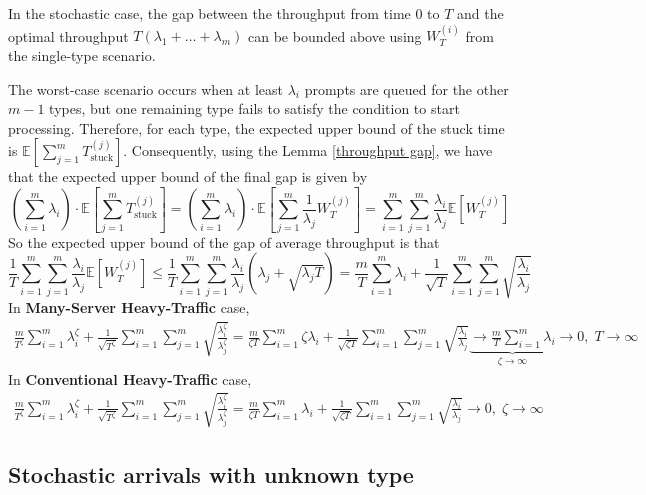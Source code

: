 \documentclass[opre, nonblindrev]{informs3} %
\begin{document}
In the stochastic case, the gap between the throughput from time $0$ to $T$ and the optimal throughput $T(\lambda_1 + \dots + \lambda_m)$ can be bounded above using $W_T^{(i)}$ from the single-type scenario.

The worst-case scenario occurs when at least $\lambda_i$ prompts are queued for the other $m-1$ types, but one remaining type fails to satisfy the condition to start processing. Therefore, for each type, the expected upper bound of the stuck time is $\mathbb{E}\left[\sum_{j=1}^m T^{(j)}_{\text{stuck}}\right]$. Consequently, using the Lemma \ref{throughput gap}, we have that the expected upper bound of the final gap is given by
$$
\left(\sum_{i=1}^m \lambda_i\right)\cdot \mathbb{E}\left[\sum_{j=1}^m T^{(j)}_{\text{stuck}}\right]=\left(\sum_{i=1}^m \lambda_i\right)\cdot \mathbb{E}\left[\sum_{j=1}^m \frac{1}{\lambda_j}W_T^{(j)}\right]=\sum_{i=1}^m\sum_{j=1}^m\frac{\lambda_i}{\lambda_j}\mathbb{E}[W_T^{(j)}]
$$
So the expected upper bound of the gap of average throughput is that 
$$\frac{1}{T}\sum_{i=1}^m\sum_{j=1}^m\frac{\lambda_i}{\lambda_j}\mathbb{E}[W_T^{(j)}]\leq \frac{1}{T}\sum_{i=1}^m\sum_{j=1}^m\frac{\lambda_i}{\lambda_j}\left( \lambda_j+\sqrt{\lambda_jT} \right)=\frac{m}{T}\sum_{i=1}^m\lambda_i+\frac{1}{\sqrt{T}}\sum_{i=1}^m\sum_{j=1}^m\sqrt{\frac{\lambda_i}{\lambda_j}}$$
In \textbf{Many-Server Heavy-Traffic} case, 
\begin{align*}
   \frac{m}{T^{\zeta}}\sum_{i=1}^m\lambda_i^{\zeta}+\frac{1}{\sqrt{T^{\zeta}}}\sum_{i=1}^m\sum_{j=1}^m\sqrt{\frac{\lambda_i^{\zeta}}{\lambda_j^{\zeta}}}= \frac{m}{\zeta T}\sum_{i=1}^m\zeta\lambda_i+\frac{1}{\sqrt{\zeta T}}\sum_{i=1}^m\sum_{j=1}^m\sqrt{\frac{\lambda_i}{\lambda_j}}\underbrace{\to \frac{m}{T}\sum_{i=1}^m\lambda_i}_{\zeta\to \infty}\to 0,\; T\to \infty 
\end{align*}
In \textbf{Conventional Heavy-Traffic} case, 
\begin{align*}
 \frac{m}{T^{\zeta}}\sum_{i=1}^m\lambda_i^{\zeta}+\frac{1}{\sqrt{T^{\zeta}}}\sum_{i=1}^m\sum_{j=1}^m\sqrt{\frac{\lambda_i^{\zeta}}{\lambda_j^{\zeta}}}= \frac{m}{\zeta T}\sum_{i=1}^m\lambda_i+\frac{1}{\sqrt{\zeta T}}\sum_{i=1}^m\sum_{j=1}^m\sqrt{\frac{\lambda_i}{\lambda_j}}\to 0,\; \zeta\to \infty
\end{align*}


\subsection{Stochastic arrivals with unknown type}
\end{document}
